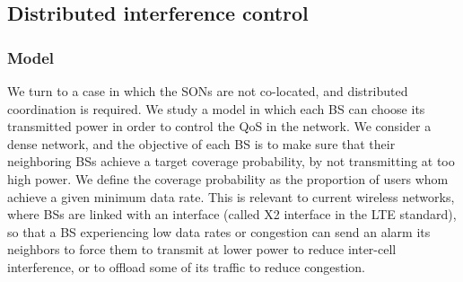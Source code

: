 \documentclass[10pt,conference,letterpaper]{IEEEtran}
\begin{document}
\subsection{Distributed interference control}
\subsubsection{Model}
	We turn to a case in which the \acp{SON} are not co-located, and distributed coordination is required. We study a model in which each \ac{BS} can choose its transmitted power in order to control the \ac{QoS} in the network. We consider a dense network, and the objective of each \ac{BS} is to make sure that their neighboring \acp{BS} achieve a target coverage probability, by not transmitting at too high power. We define the coverage probability as the proportion of users whom achieve a given minimum data rate. This is relevant to current wireless networks, where \acp{BS} are linked with an interface (called X2 interface in the \ac{LTE} standard), so that a \ac{BS} experiencing low data rates or congestion can send an alarm its neighbors to force them to transmit at lower power to reduce inter-cell interference, or to offload some of its traffic to reduce congestion.
	
\end{document}
